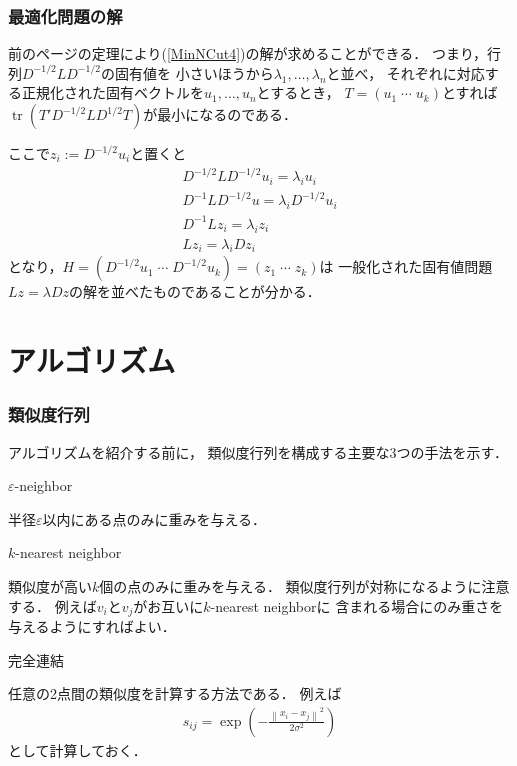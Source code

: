 \documentclass[10pt,hyperref={unicode}]{beamer}
\DeclareMathOperator*{\tr}{tr}
\newenvironment{wideenumerate}{\enumerate\addtolength{\itemsep}{1em}}{\endenumerate}
\newcommand{\pref}[1]{{\fontfamily{cmr}\selectfont (\ref{#1})}}
\newcommand{\parentheses}[1]{\left(#1\right)}
\newcommand{\norm}[1]{\left\|#1\right\|}
\begin{document}
\begin{frame}
\frametitle{最適化問題の解}
前のページの定理により\pref{MinNCut4}の解が求めることができる．
つまり，行列$D^{-1/2}LD^{-1/2}$の固有値を
小さいほうから$\lambda_1,\ldots,\lambda_n$と並べ，
それぞれに対応する正規化された固有ベクトルを$u_1,\ldots,u_n$とするとき，
$T = \parentheses{u_1 \; \cdots \; u_k}$とすれば
$\tr\parentheses{T'D^{-1/2}LD^{1/2}T}$が最小になるのである．

\bigskip

ここで$z_i := D^{-1/2}u_i$と置くと
\begin{gather*}
    D^{-1/2}LD^{-1/2}u_i = \lambda_i u_i \\
    D^{-1}LD^{-1/2}u = \lambda_i D^{-1/2}u_i \\
    D^{-1}Lz_i = \lambda_i z_i \\
    Lz_i = \lambda_i D z_i
\end{gather*}
となり，$H = \parentheses{D^{-1/2}u_1 \; \cdots \; D^{-1/2}u_k} = \parentheses{z_1 \; \cdots \; z_k}$は
一般化された固有値問題$L z = \lambda D z$の解を並べたものであることが分かる．
\end{frame}

\section{アルゴリズム}
\begin{frame}
\frametitle{類似度行列}
アルゴリズムを紹介する前に，
類似度行列を構成する主要な3つの手法を示す．

\bigskip

\begin{wideenumerate}
    \item $\varepsilon$-neighbor

        半径$\varepsilon$以内にある点のみに重みを与える．

    \item $k$-nearest neighbor

        類似度が高い$k$個の点のみに重みを与える．
        類似度行列が対称になるように注意する．
        例えば$v_i$と$v_j$がお互いに$k$-nearest neighborに
        含まれる場合にのみ重さを与えるようにすればよい．

    \item 完全連結

        任意の2点間の類似度を計算する方法である．
        例えば
        \begin{align*}
            s_{ij} = \exp\parentheses{- \frac{\norm{x_i - x_j}^2 }{2\sigma^2}}
        \end{align*}
        として計算しておく．
\end{wideenumerate}
\end{frame}
\end{document}
